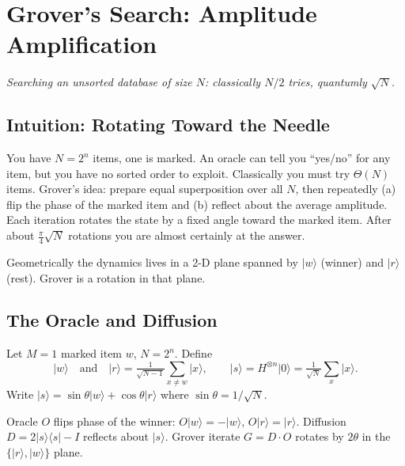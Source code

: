 \chapter{Grover's Search: Amplitude Amplification}\label{ch:grover}
\begin{center}\small\textit{Searching an unsorted database of size $N$: classically $N/2$ tries, quantumly $\sqrt{N}$.}\end{center}

\section{Intuition: Rotating Toward the Needle}
You have $N=2^n$ items, one is marked. An oracle can tell you ``yes/no'' for any item, but you have no sorted order to exploit. Classically you must try $\Theta(N)$ items. Grover's idea: prepare equal superposition over all $N$, then repeatedly (a) flip the phase of the marked item and (b) reflect about the average amplitude. Each iteration rotates the state by a fixed angle toward the marked item. After about $\tfrac{\pi}{4}\sqrt{N}$ rotations you are almost certainly at the answer.

Geometrically the dynamics lives in a 2-D plane spanned by $\lvert w\rangle$ (winner) and $\lvert r\rangle$ (rest). Grover is a rotation in that plane.

\section{The Oracle and Diffusion}
Let $M=1$ marked item $w$, $N=2^n$. Define
\begin{equation}
\lvert w\rangle\quad\text{and}\quad
\lvert r\rangle=\tfrac1{\sqrt{N-1}}\sum_{x\neq w}\lvert x\rangle,\qquad
\lvert s\rangle=H^{\otimes n}\lvert0\rangle=\tfrac1{\sqrt N}\sum_x\lvert x\rangle.
\end{equation}
Write $\lvert s\rangle=\sin\theta\lvert w\rangle+\cos\theta\lvert r\rangle$ where $\sin\theta=1/\sqrt N$.

Oracle $O$ flips phase of the winner: $O\lvert w\rangle=-\lvert w\rangle$, $O\lvert r\rangle=\lvert r\rangle$. Diffusion $D=2\lvert s\rangle\langle s\rvert-I$ reflects about $\lvert s\rangle$. Grover iterate $G=D\cdot O$ rotates by $2\theta$ in the $\{ \lvert r\rangle,\lvert w\rangle\}$ plane.

